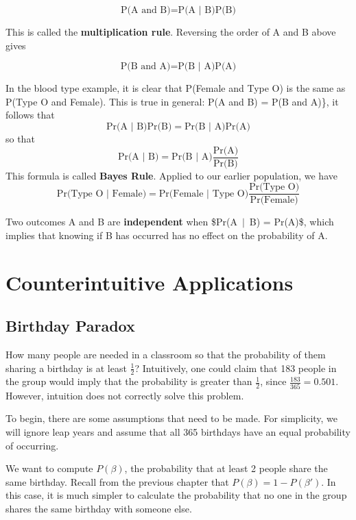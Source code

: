 \documentclass[
]{book}
\begin{document}
\[
\mbox{P(A and B)} = \mbox{P(A | B)}\mbox{P(B)}  
\]

This is called the \textbf{multiplication rule}. Reversing the order of A and B above gives

\[
\mbox{P(B and A)} = \mbox{P(B | A)}\mbox{P(A)}  
\]

In the blood type example, it is clear that P(Female and Type O) is the same as P(Type O and Female).
This is true in general: P(A and B) = P(B and A)\}, it follows that
\[
\mbox{Pr(A $|$ B)}\mbox{Pr(B)}  = \mbox{Pr(B $|$ A)}\mbox{Pr(A)} 
\]
so that
\[
\mbox{Pr(A $|$ B)}  = \mbox{Pr(B $|$ A)}\frac{\mbox{Pr(A)}}{\mbox{Pr(B)}}
\]
This formula is called \textbf{Bayes Rule}. Applied to our earlier population, we have
\[
\mbox{Pr(Type O $|$ Female)} = \mbox{Pr(Female $|$ Type O)}\frac{\mbox{Pr(Type O)}}{\mbox{Pr(Female)}}
\]

Two outcomes A and B are \textbf{independent} when \$\mbox{Pr(A $|$ B)} = \mbox{Pr(A)}\$,
which implies that knowing if B has occurred has no effect on the probability of A.

\hypertarget{counterintuitive-applications}{%
\chapter{Counterintuitive Applications}\label{counterintuitive-applications}}

\hypertarget{birthday-paradox}{%
\section{Birthday Paradox}\label{birthday-paradox}}

How many people are needed in a classroom so that the probability of them sharing a birthday is at least \(\frac{1}{2}\)?
Intuitively, one could claim that 183 people in the group would imply that the probability is greater than \(\frac{1}{2}\),
since \(\frac{183}{365} = 0.501\). However, intuition does not correctly solve this problem.

To begin, there are some assumptions that need to be made.
For simplicity, we will ignore leap years and assume that all 365 birthdays have an equal probability of occurring.

We want to compute \(P(\beta)\), the probability that at least 2 people share the same birthday.
Recall from the previous chapter that \(P(\beta) = 1 - P(\beta')\).
In this case, it is much simpler to calculate the probability that no one in the group shares the same birthday with someone else.
\end{document}
